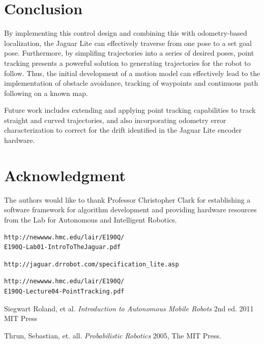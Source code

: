 \documentclass[conference]{IEEEtran}
\begin{document}
\section{Conclusion}
By implementing this control design and combining this with odometry-based localization, the Jaguar 
Lite can effectively traverse from one pose to a set goal pose.
Furthermore, by simplifing trajectories into a series of desired poses,
point tracking presents a powerful solution to generating trajectories 
for the robot to follow.  Thus, the initial development of a motion model
can effectively lead to the implementation of obstacle avoidance, 
tracking of waypoints and continuous path following on a known map.

Future work 
includes extending and applying point tracking capabilities to track 
straight and curved trajectories, and also incorporating odometry error 
characterization to correct for the drift identified in the Jaguar Lite encoder hardware.


\section*{Acknowledgment}


The authors would like to thank Professor Christopher Clark for 
establishing a software framework for algorithm development and
 providing hardware resources from the Lab for Autonomous and
 Intelligent Robotics.




\begin{thebibliography}{1}

\begin{verbatim}
http://newwww.hmc.edu/lair/E190Q/
E190Q-Lab01-IntroToTheJaguar.pdf
\end{verbatim}

\begin{verbatim}
http://jaguar.drrobot.com/specification_lite.asp
\end{verbatim}

\begin{verbatim}
http://newwww.hmc.edu/lair/E190Q/
E190Q-Lecture04-PointTracking.pdf
\end{verbatim}

Siegwart Roland, et al. \emph{Introduction to Autonomous Mobile Robots} 2nd ed. 
2011 MIT Press

Thrun, Sebastian, et. all. \emph{Probabilistic Robotics}
2005, The MIT Press.


\end{thebibliography}




\end{document}
